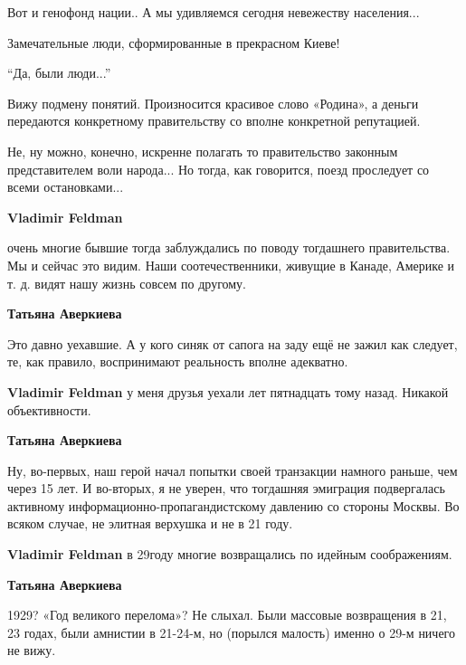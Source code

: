 \begin{itemize}
\begin{itemize}
\end{itemize} %

Вот и генофонд нации..
А мы удивляемся сегодня невежеству населения...

Замечательные люди, сформированные в прекрасном Киеве!

\enquote{Да, были люди...}


Вижу подмену понятий. Произносится красивое слово «Родина», а деньги передаются
конкретному правительству со вполне конкретной репутацией.

Не, ну можно, конечно, искренне полагать то правительство законным
представителем воли народа... Но тогда, как говорится, поезд проследует со всеми
остановками...

\begin{itemize} %
\textbf{Vladimir Feldman} 

очень многие бывшие тогда заблуждались по поводу тогдашнего правительства. Мы и
сейчас это видим. Наши соотечественники, живущие в Канаде, Америке и т. д. видят
нашу жизнь совсем по другому.


\textbf{Татьяна Аверкиева} 

Это давно уехавшие. А у кого синяк от сапога на заду ещё не зажил как следует,
те, как правило, воспринимают реальность вполне адекватно.

\textbf{Vladimir Feldman} у меня друзья уехали лет пятнадцать тому назад. Никакой объективности.

\begin{itemize} %
\textbf{Татьяна Аверкиева} 

Ну, во-первых, наш герой начал попытки своей транзакции намного раньше, чем
через 15 лет. И во-вторых, я не уверен, что тогдашняя эмиграция подвергалась
активному информационно\hyp пропагандистскому давлению со стороны Москвы. Во всяком
случае, не элитная верхушка и не в 21 году.

\end{itemize} %

\textbf{Vladimir Feldman} в 29году многие возвращались по идейным соображениям.

\begin{itemize} %
\textbf{Татьяна Аверкиева} 

1929? «Год великого перелома»? Не слыхал. Были массовые возвращения в 21, 23
годах, были амнистии в 21-24-м, но (порылся малость) именно о 29-м ничего не
вижу.


\end{itemize}
\end{itemize}
\end{itemize}
